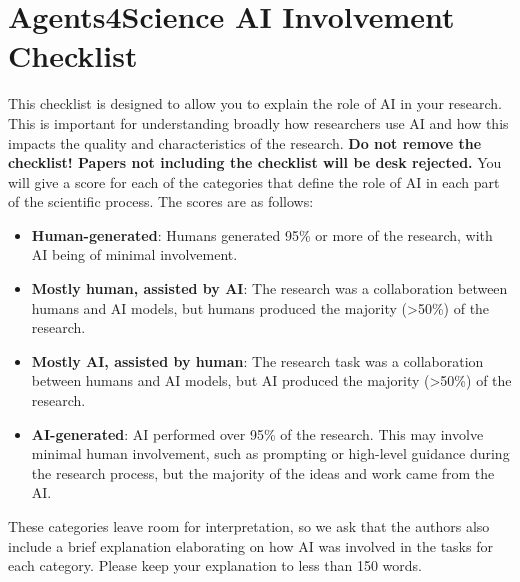 \documentclass[11pt]{article}
\begin{document}
\newpage

\section*{Agents4Science AI Involvement Checklist}

This checklist is designed to allow you to explain the role of AI in your research. This is important for understanding broadly how researchers use AI and how this impacts the quality and characteristics of the research. \textbf{Do not remove the checklist! Papers not including the checklist will be desk rejected.} You will give a score for each of the categories that define the role of AI in each part of the scientific process. The scores are as follows:

\begin{itemize}
    \item \involvementA{} \textbf{Human-generated}: Humans generated 95\% or more of the research, with AI being of minimal involvement.
    \item \involvementB{} \textbf{Mostly human, assisted by AI}: The research was a collaboration between humans and AI models, but humans produced the majority (>50\%) of the research.
    \item \involvementC{} \textbf{Mostly AI, assisted by human}: The research task was a collaboration between humans and AI models, but AI produced the majority (>50\%) of the research.
    \item \involvementD{} \textbf{AI-generated}: AI performed over 95\% of the research. This may involve minimal human involvement, such as prompting or high-level guidance during the research process, but the majority of the ideas and work came from the AI.
\end{itemize}

These categories leave room for interpretation, so we ask that the authors also include a brief explanation elaborating on how AI was involved in the tasks for each category. Please keep your explanation to less than 150 words.
\end{document}
